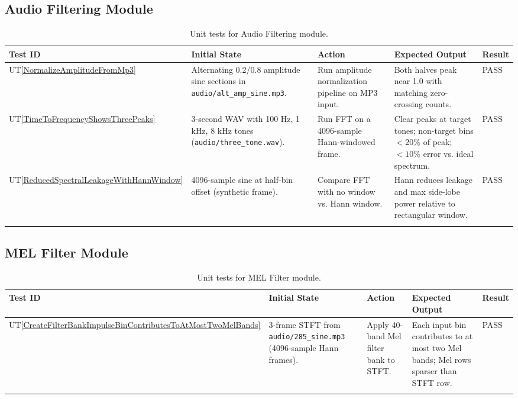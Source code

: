 \documentclass[12pt, titlepage]{article}
\newcommand{\utref}[1]{UT\ref{#1}}
\begin{document}
\subsection{Audio Filtering Module}
{\footnotesize
\begin{longtable}{|p{0.8cm}|p{3.5cm}|p{3.5cm}|p{3.5cm}|p{1cm}|}
    \hline
    \textbf{Test ID} & \textbf{Initial State} & \textbf{Action} &
    \textbf{Expected Output} & \textbf{Result} \\ 
    \endfirsthead
    \hline

    \utref{NormalizeAmplitudeFromMp3} & Alternating 0.2/0.8 amplitude sine
    sections in \texttt{audio/alt\_amp\_sine.mp3}. & Run amplitude normalization
    pipeline on MP3 input.  & Both halves peak near 1.0 with matching
    zero-crossing counts. & PASS\\
    \hline
    \utref{TimeToFrequencyShowsThreePeaks} & 3-second WAV with 100 Hz, 1 kHz, 8
    kHz tones (\texttt{audio/three\_tone.wav}). & Run FFT on a 4096-sample
    Hann-windowed frame.  & Clear peaks at target tones; non-target bins $<20\%$
    of peak; $<10\%$ error vs. ideal spectrum. & PASS\\
    \hline
    \utref{ReducedSpectralLeakageWithHannWindow} & 4096-sample sine at half-bin
    offset (synthetic frame). & Compare FFT with no window vs. Hann window.  &
    Hann reduces leakage and max side-lobe power relative to rectangular window.
    & PASS\\
    \hline

    \caption{Unit tests for Audio Filtering module.}
    \label{tab:unit_test_audio_filtering}
\end{longtable}
}

\subsection{MEL Filter Module}
{\footnotesize
\begin{longtable}{|p{0.8cm}|p{3.5cm}|p{3.5cm}|p{3.5cm}|p{1cm}|}
    \hline
    \textbf{Test ID} & \textbf{Initial State} & \textbf{Action} &
    \textbf{Expected Output} & \textbf{Result} \\ 
    \endfirsthead
    \hline

    \utref{CreateFilterBankImpulseBinContributesToAtMostTwoMelBands} & 3-frame
    STFT from \texttt{audio/285\_sine.mp3} (4096-sample Hann frames). & Apply
    40-band Mel filter bank to STFT.  & Each input bin contributes to at most
    two Mel bands; Mel rows sparser than STFT row. & PASS\\
    \hline
    \caption{Unit tests for MEL Filter module.}
    \label{tab:unit_test_mel}
\end{longtable}
}
\end{document}
